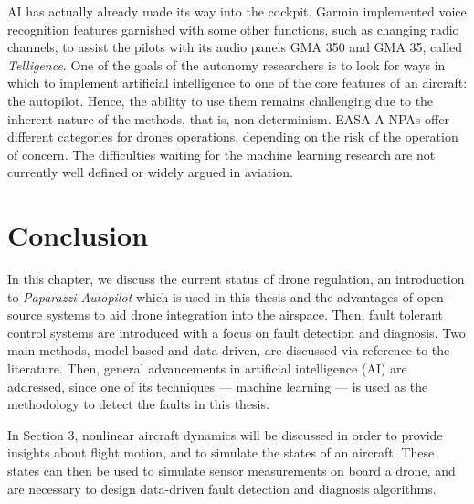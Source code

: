 AI has actually already made its way into the cockpit. Garmin implemented voice recognition features garnished with some other functions, such as changing radio channels, to assist the pilots with its audio panels GMA 350 and GMA 35, called \emph{Telligence}. 
One of the goals of the autonomy researchers is to look for ways in which to implement artificial intelligence to one of the core features of an aircraft: the autopilot. Hence, the ability to use them remains challenging due to the inherent nature of the methods, that is, non-determinism. EASA A-NPAs offer different categories for drones operations, depending on the risk of the operation of concern. The difficulties waiting for the machine learning research are not currently well defined or widely argued in aviation. 


\section{Conclusion}

In this chapter, we discuss the current status of drone regulation, an introduction to \emph{Paparazzi Autopilot} which is used in this thesis and the advantages of open-source systems to aid drone integration into the airspace. Then, fault tolerant control systems are introduced with a focus on fault detection and diagnosis. Two main methods, model-based and data-driven, are discussed via reference to the literature. Then, general advancements in artificial intelligence (AI) are addressed, since one of its techniques --- machine learning --- is used as the methodology to detect the faults in this thesis. 

In Section 3, nonlinear aircraft dynamics will be discussed in order to provide insights about flight motion, and to simulate the states of an aircraft. These states can then be used to simulate sensor measurements on board a drone, and are necessary to design data-driven fault detection and diagnosis algorithms.
